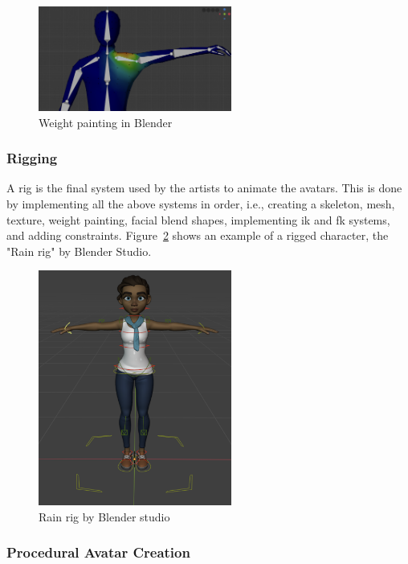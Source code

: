 \documentclass[../../main.tex]{subfiles}
\begin{document}
\begin{figure} 
  \centering \includegraphics[width = 2.5in]{chapters/background_work/images/weight_painting.png} 
  \caption{Weight painting in Blender} 
  \label{fig:weight_painting} 
\end{figure}

\subsubsection{Rigging}
\label{ch:background_work:sign_language_synthesis:3d_techniques:rigging}

A rig is the final system used by the artists to animate the avatars. This is done by implementing all the above systems in order, i.e., creating a skeleton, mesh, texture, weight painting, facial blend shapes, implementing \gls{ik} and \gls{fk} systems, and adding constraints. Figure~\ref{fig:rig_example} shows an example of a rigged character, the "Rain rig" by Blender Studio.

\begin{figure} 
  \centering \includegraphics[width = 2.5in]{chapters/background_work/images/rig_example.png} 
  \caption{Rain rig by Blender studio} 
  \label{fig:rig_example} 
\end{figure}

\subsubsection{Procedural Avatar Creation}
\label{ch:background_work:sign_language_synthesis:3d_techniques:procedural_avatar_creation}
\end{document}
